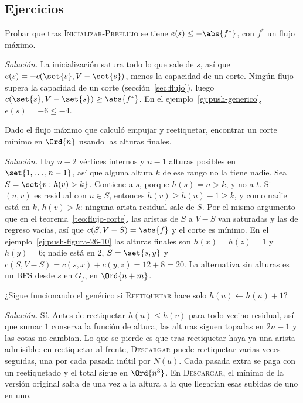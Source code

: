 \documentclass[11pt,letterpaper]{article}
\begin{document}

\subsection*{Ejercicios}

\begin{ejercicio}[Cormen, 26.4-1]
  Probar que tras \textsc{Inicializar-Preflujo} se tiene
  $e(s) \le -\abs{f^*}$, con $f^*$ un flujo máximo.

  \textit{Solución.} La inicialización satura todo lo que sale de $s$,
  así que $e(s) = -c(\set{s}, V - \set{s})$, menos la capacidad de un
  corte. Ningún flujo supera la capacidad de un corte
  (sección~\ref{sec:flujo}), luego
  $c(\set{s}, V - \set{s}) \ge \abs{f^*}$. En el
  ejemplo~\ref{ej:push-generico}, $e(s) = -6 \le -4$.
\end{ejercicio}

\begin{ejercicio}[Cormen, 26.4-4]
  \label{ej:push-corte}
  Dado el flujo máximo que calculó empujar y reetiquetar, encontrar un
  corte mínimo en $\Ord{n}$ usando las alturas finales.

  \textit{Solución.} Hay $n - 2$ vértices internos y $n - 1$ alturas
  posibles en $\set{1, \dots, n - 1}$, así que alguna altura $k$ de ese
  rango no la tiene nadie. Sea $S = \set{v : h(v) > k}$. Contiene a
  $s$, porque $h(s) = n > k$, y no a $t$. Si $(u, v)$ es residual con
  $u \in S$, entonces $h(v) \ge h(u) - 1 \ge k$, y como nadie está en
  $k$, $h(v) > k$: ninguna arista residual sale de $S$. Por el mismo
  argumento que en el teorema~\ref{teo:flujo-corte}, las aristas de
  $S$ a $V - S$ van saturadas y las de regreso vacías, así que
  $c(S, V - S) = \abs{f}$ y el corte es mínimo. En el
  ejemplo~\ref{ej:push-figura-26-10} las alturas finales son
  $h(x) = h(z) = 1$ y $h(y) = 6$; nadie está en $2$, $S = \set{s, y}$ y
  $c(S, V - S) = c(s, x) + c(y, z) = 12 + 8 = 20$. La alternativa sin
  alturas es un BFS desde $s$ en $G_f$, en $\Ord{n + m}$.
\end{ejercicio}

\begin{ejercicio}[Cormen, 26.5-3]
  ¿Sigue funcionando el genérico si \textsc{Reetiquetar} hace solo
  $h(u) \gets h(u) + 1$?

  \textit{Solución.} Sí. Antes de reetiquetar $h(u) \le h(v)$ para
  todo vecino residual, así que sumar $1$ conserva la función de altura,
  las alturas siguen topadas en $2n - 1$ y las cotas no cambian. Lo
  que se pierde es que tras reetiquetar haya ya una arista admisible:
  en reetiquetar al frente, \textsc{Descargar} puede reetiquetar varias
  veces seguidas, una por cada pasada inútil por $N(u)$. Cada pasada
  extra se paga con un reetiquetado y el total sigue en $\Ord{n^3}$.
  En \textsc{Descargar}, el mínimo de la versión original salta de una
  vez a la altura a la que llegarían esas subidas de uno en uno.
\end{ejercicio}
\end{document}
